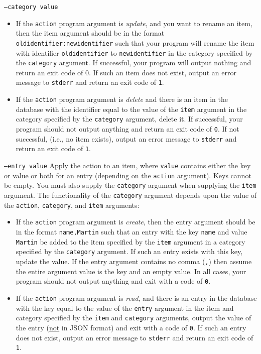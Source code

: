 \documentclass[a4paper]{article}
\begin{document}
\begin{labeling}{ \texttt{--category value} }
\begin{itemize}
        \item If the \texttt{action} program argument is \emph{update}, and you want to rename an item, then the item argument should be in the format \\\texttt{oldidentifier:newidentifier} such that your program will rename the item with identifier \texttt{oldidentifier} to \texttt{newidentifier} in the category specified by the \texttt{category} argument. If successful, your program will output nothing and return an exit code of 0. If such an item does not exist, output an error message to \texttt{stderr} and return an exit code of \texttt{1}.
    
        \item If the \texttt{action} program argument is \emph{delete} and there is an item in the database with the identifier equal to the value of the \texttt{item} argument in the category specified by the \texttt{category} argument, delete it. If successful, your program should not output anything and return an exit code of \texttt{0}. If not successful, (i.e., no item exists), output an error message to \texttt{stderr} and return an exit code of \texttt{1}.
        \end{itemize}

    \item[\texttt{--entry value}]
    Apply the action to an item, where \texttt{value} contains either the key or value or both for an entry (depending on the \texttt{action} argument). Keys cannot be empty. You must also supply the \texttt{category} argument when supplying the \texttt{item} argument.  The functionality of the \texttt{category} argument depends upon the value of the \texttt{action}, \texttt{category}, and \texttt{item} arguments:
        \begin{itemize}
    
        \item If the \texttt{action} program argument is \emph{create}, then the entry argument should be in the format \texttt{name,Martin} such that an entry with the key \texttt{name} and value \texttt{Martin} be added to the item specified by the \texttt{item} argument in a category specified by the \texttt{category} argument. If such an entry exists with this key, update the value. If the entry argument contains no comma (\texttt{,}) then assume the entire argument value is the key and an empty value. In all cases, your program should not output anything and exit with a code of \texttt{0}.
    
        \item If the \texttt{action} program argument is \emph{read}, and there is an entry in the database with the key equal to the value of the \texttt{entry} argument in the item and category specified by the \texttt{item} and \texttt{category} arguments, output the value of the entry (\underline{not} in JSON format) and exit with a code of \texttt{0}. If such an entry does not exist, output an error message to \texttt{stderr} and return an exit code of \texttt{1}.
    

\end{itemize}
\end{labeling}
\end{document}
